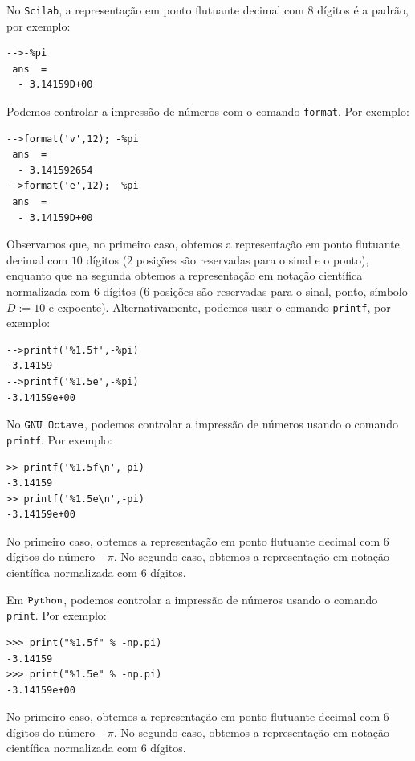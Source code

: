 \ifisscilab
\begin{obs}
No \verb+Scilab+, a representação em ponto flutuante decimal com $8$ dígitos é a padrão, por exemplo:
\begin{verbatim}
-->-%pi
 ans  =
  - 3.14159D+00
\end{verbatim}
Podemos controlar a impressão de números com o comando \verb+format+. Por exemplo:
\begin{verbatim}
-->format('v',12); -%pi
 ans  =
  - 3.141592654
-->format('e',12); -%pi
 ans  =
  - 3.14159D+00
\end{verbatim}
Observamos que, no primeiro caso, obtemos a representação em ponto flutuante decimal com $10$ dígitos ($2$ posições são reservadas para o sinal e o ponto), enquanto que na segunda obtemos a representação em notação científica normalizada com $6$ dígitos ($6$ posições são reservadas para o sinal, ponto, símbolo $D := 10$ e expoente). Alternativamente, podemos usar o comando \verb+printf+, por exemplo:
\begin{verbatim}
-->printf('%1.5f',-%pi)
-3.14159
-->printf('%1.5e',-%pi)
-3.14159e+00
\end{verbatim}
\end{obs}
\fi
\ifisoctave
\begin{obs}
No $\verb+GNU Octave+$, podemos controlar a impressão de números usando o comando \verb+printf+. Por exemplo:
\begin{verbatim}
>> printf('%1.5f\n',-pi)
-3.14159
>> printf('%1.5e\n',-pi)
-3.14159e+00
\end{verbatim}
No primeiro caso, obtemos a representação em ponto flutuante decimal com $6$ dígitos do número $-\pi$. No segundo caso, obtemos a representação em notação científica normalizada com $6$ dígitos.
\end{obs}
\fi
\ifispython
\begin{obs}
Em $\verb+Python+$, podemos controlar a impressão de números usando o comando \verb+print+. Por exemplo:
\begin{verbatim}
>>> print("%1.5f" % -np.pi)
-3.14159
>>> print("%1.5e" % -np.pi)
-3.14159e+00
\end{verbatim}
No primeiro caso, obtemos a representação em ponto flutuante decimal com $6$ dígitos do número $-\pi$. No segundo caso, obtemos a representação em notação científica normalizada com $6$ dígitos.
\end{obs}
\fi


